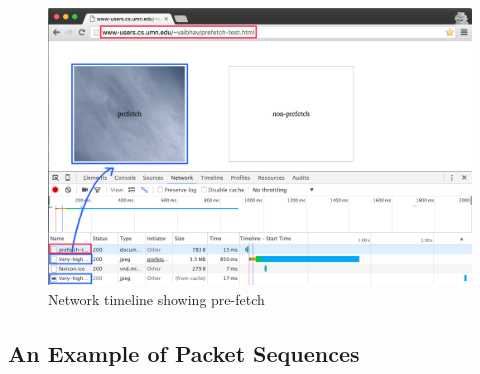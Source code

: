 \begin{figure}[h]
\includegraphics[width=\textwidth]{figures/prefetch-network-edited.png}
\centering
\caption{Network timeline showing pre-fetch}
\label{fig:network}
\end{figure}

\subsection{An Example of Packet Sequences}

